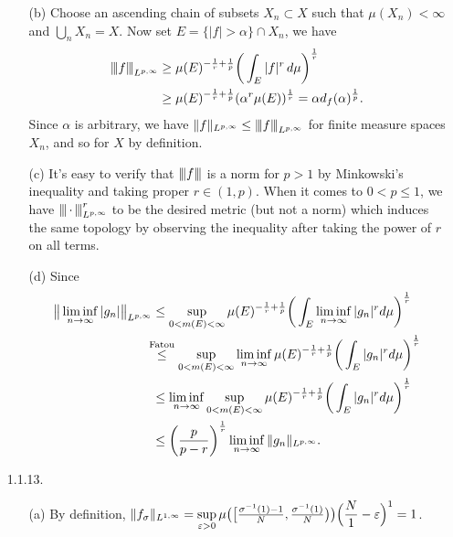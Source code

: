 \begin{enumerate}
\begin{enumerate}
    \item[(b)] Choose an ascending chain of subsets $X_{n} \subset X$ 
    such that $\mu(X_{n})<\infty$ and $\bigcup_{n} X_{n} = X$. 
    Now set $E=\{|f|>\alpha\}\cap X_{n}$, we have 
    \begin{equation*}\begin{aligned}
    \norml{f}_{L^{p,\infty}} &\geq \mu(E)^{-\frac{1}{r}+\frac{1}{p}}
    \bigg(\int_{E}|f|^r\,d\mu\bigg)^{\frac{1}{r}} \\
    &\geq \mu(E)^{-\frac{1}{r}+\frac{1}{p}}(\alpha^{r}\mu(E))^{\frac{1}{r}}
    =\alpha d_{f}(\alpha)^{\frac{1}{p}}.
    \end{aligned}\end{equation*}
    Since $\alpha$  is arbitrary, we have 
    $\norm{f}_{L^{p,\infty}} \leq \norml{f}_{L^{p,\infty}}$ 
    for finite measure spaces $X_{n}$, and so for $X$ by definition.
    
    \item[(c)] It's easy to verify that $\norml{f}$ is a norm for $p>1$ 
    by Minkowski's inequality and taking proper $r \in (1,p)$. 
    When it comes to $0<p\leq 1$, we have 
    $\norml{\,\cdot\,}_{L^{p,\infty}}^{r}$ to be the desired metric 
    (but not a norm) which induces the same topology 
    by observing the inequality after taking the power of $r$ on all terms.
    
    \item[(d)] Since
    \begin{equation*}\begin{aligned}
    \big\|\liminf_{n \rightarrow \infty} |g_{n}|\big\|_{L^{p,\infty}}
    &\le\sup_{0<m(E)<\infty}\mu(E)^{-\frac{1}{r}+\frac{1}{p}}\bigg(\int_{E}\liminf_{n \rightarrow \infty} |g_{n}|^{r}d\mu\bigg)^{\frac{1}{r}} \\
    &\!\!\!\overset{\text{Fatou}}{\leq}
    \sup_{0<m(E)<\infty}\liminf_{n \rightarrow \infty}\mu(E)^{-\frac{1}{r}+\frac{1}{p}}\bigg(\int_{E} |g_{n}|^{r}d\mu\bigg)^{\frac{1}{r}} \\
    &\leq \liminf_{n \rightarrow \infty}\sup_{0<m(E)<\infty}\mu(E)^{-\frac{1}{r}+\frac{1}{p}}\bigg(\int_{E} |g_{n}|^{r}d\mu\bigg)^{\frac{1}{r}} \\
    &\leq \bigg(\frac{p}{p-r}\bigg)^{\frac{1}{r}}\liminf_{n \rightarrow \infty}\norm{g_{n}}_{L^{p,\infty}}.
    \end{aligned}\end{equation*}
    \end{enumerate}

\item[1.1.13.]
    \begin{enumerate}
    \item[(a)] By definition, $\Vert f_{\sigma} \Vert_{L^{1,\infty}}
    =\sup\limits_{\varepsilon>0}\mu\big(\big[\frac{\sigma^{-1}(1)-1}{N},
    \frac{\sigma^{-1}(1)}{N}\big)\big)\Big(\dfrac{N}{1}-\varepsilon\Big)^{1}=1$.


\end{enumerate}
\end{enumerate}
